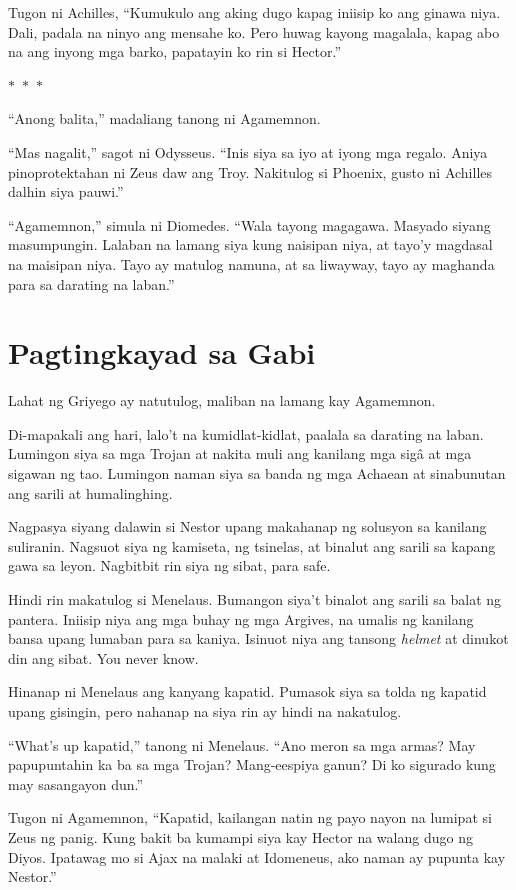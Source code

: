 \documentclass[12pt,letterpaper]{report}
\newcommand{\seperate}{\begin{center}$\ast$~$\ast$~$\ast$\end{center}}
\begin{document}
Tugon ni Achilles, ``Kumukulo ang aking dugo kapag iniisip ko ang ginawa niya. Dali, padala na ninyo ang mensahe ko. Pero huwag kayong magalala, kapag abo na ang inyong mga barko, papatayin ko rin si Hector.''

\seperate

``Anong balita,'' madaliang tanong ni Agamemnon.

``Mas nagalit,'' sagot ni Odysseus. ``Inis siya sa iyo at iyong mga regalo. Aniya pinoprotektahan ni Zeus daw ang Troy. Nakitulog si Phoenix, gusto ni Achilles dalhin siya pauwi.''

``Agamemnon,'' simula ni Diomedes. ``Wala tayong magagawa. Masyado siyang masumpungin. Lalaban na lamang siya kung naisipan niya, at tayo'y magdasal na maisipan niya. Tayo ay matulog namuna, at sa liwayway, tayo ay maghanda para sa darating na laban.''

\pagebreak

\chapter{Pagtingkayad sa Gabi}

Lahat ng Griyego ay natutulog, maliban na lamang kay Agamemnon.

Di-mapakali ang hari, lalo't na kumidlat-kidlat, paalala sa darating na laban. Lumingon siya sa mga Trojan at nakita muli ang kanilang mga sig\^a at mga sigawan ng tao. Lumingon naman siya sa banda ng mga Achaean at sinabunutan ang sarili at humalinghing.

Nagpasya siyang dalawin si Nestor upang makahanap ng solusyon sa kanilang suliranin. Nagsuot siya ng kamiseta, ng tsinelas, at binalut ang sarili sa kapang gawa sa leyon. Nagbitbit rin siya ng sibat, para safe.

Hindi rin makatulog si Menelaus. Bumangon siya't binalot ang sarili sa balat ng pantera. Iniisip niya ang mga buhay ng mga Argives, na umalis ng kanilang bansa upang lumaban para sa kaniya. Isinuot niya ang tansong \textit{helmet} at dinukot din ang sibat. You never know.

Hinanap ni Menelaus ang kanyang kapatid. Pumasok siya sa tolda ng kapatid upang gisingin, pero nahanap na siya rin ay hindi na nakatulog.

``What's up kapatid,'' tanong ni Menelaus. ``Ano meron sa mga armas? May papupuntahin ka ba sa mga Trojan? Mang-eespiya ganun? Di ko sigurado kung may sasangayon dun.''

Tugon ni Agamemnon, ``Kapatid, kailangan natin ng payo nayon na lumipat si Zeus ng panig. Kung bakit ba kumampi siya kay Hector na walang dugo ng Diyos. Ipatawag mo si Ajax na malaki at Idomeneus, ako naman ay pupunta kay Nestor.''
\end{document}
